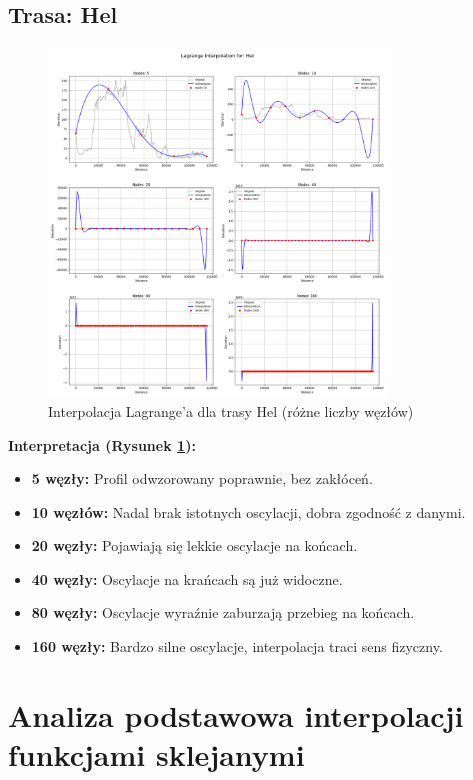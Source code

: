 \documentclass[11pt,a4paper]{article}
\begin{document}
\subsection{Trasa: Hel}
\begin{figure}[H]
    \centering
    \includegraphics[width=0.8\textwidth]{plots/Hel_Lagrange_basic.png}
    \caption{Interpolacja Lagrange'a dla trasy Hel (różne liczby węzłów)}
    \label{fig:hel_lagrange}
\end{figure}
\textbf{Interpretacja (Rysunek \ref{fig:hel_lagrange}):} 
\begin{itemize}
    \item \textbf{5 węzły:} Profil odwzorowany poprawnie, bez zakłóceń.
    \item \textbf{10 węzłów:} Nadal brak istotnych oscylacji, dobra zgodność z danymi.
    \item \textbf{20 węzły:} Pojawiają się lekkie oscylacje na końcach.
    \item \textbf{40 węzły:} Oscylacje na krańcach są już widoczne.
    \item \textbf{80 węzły:} Oscylacje wyraźnie zaburzają przebieg na końcach.
    \item \textbf{160 węzły:} Bardzo silne oscylacje, interpolacja traci sens fizyczny.
\end{itemize}

\section{Analiza podstawowa interpolacji funkcjami sklejanymi}
\end{document}
